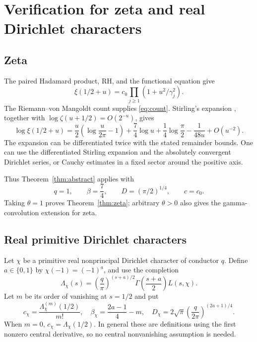 \documentclass[11pt]{article}
\theoremstyle{remark}\newtheorem{remark}[theorem]{Remark}
\begin{document}
\section{Verification for zeta and real Dirichlet characters}

\subsection{Zeta}

The paired Hadamard product, RH, and the functional equation give
\[
 \xi(1/2+u)=c_0\prod_{j\geq1}(1+u^2/\gamma_j^2).
\]
The Riemann--von Mangoldt count \cite{titchmarsh} supplies \eqref{eq:count}.
Stirling's expansion \cite{dlmf-gamma}, together with
$\log\zeta(u+1/2)=O(2^{-u})$, gives
\begin{equation}\label{eq:xi-explicit}
 \log\xi(1/2+u)
 =\frac u2\left(\log\frac{u}{2\pi}-1\right)
  +\frac74\log u+\frac14\log\frac\pi2
  -\frac1{48u}+O(u^{-2}).
\end{equation}
The expansion can be differentiated twice with the stated remainder
bounds. One can use the differentiated Stirling expansion and the
absolutely convergent Dirichlet series, or Cauchy estimates in a fixed
sector around the positive axis.

Thus Theorem~\ref{thm:abstract} applies with
\[
 q=1,\qquad \beta=\frac74,\qquad
 D=(\pi/2)^{1/4},\qquad c=c_0.
\]
Taking $\theta=1$ proves Theorem~\ref{thm:zeta}; arbitrary $\theta>0$
also gives the gamma-convolution extension for zeta.

\subsection{Real primitive Dirichlet characters}

Let $\chi$ be a primitive real nonprincipal Dirichlet character of conductor
$q$. Define $a\in\{0,1\}$ by $\chi(-1)=(-1)^a$, and use the completion
\begin{equation}\label{eq:completion}
 \Lambda_\chi(s)=
 \left(\frac q\pi\right)^{(s+a)/2}
 \Gamma\!\left(\frac{s+a}{2}\right)L(s,\chi).
\end{equation}
Let $m$ be its order of vanishing at $s=1/2$ and put
\begin{equation}\label{eq:central}
 c_\chi=\frac{\Lambda_\chi^{(m)}(1/2)}{m!},\quad
 \beta_\chi=\frac{2a-1}{4}-m,\quad
 D_\chi=2\sqrt\pi
          \left(\frac q{2\pi}\right)^{(2a+1)/4}.
\end{equation}
When $m=0$, $c_\chi=\Lambda_\chi(1/2)$. In general these are definitions
using the first nonzero central derivative, so no central nonvanishing
assumption is needed.
\end{document}

